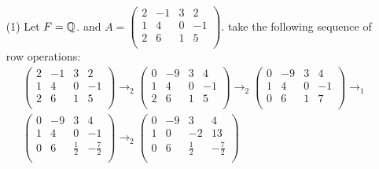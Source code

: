\begin{example}
    \begin{enumerate}
        \item[(1)] Let $F = \mathbb{Q}$. and $A=\begin{pmatrix}
                            2 & -1 & 3 & 2 \\
                            1 & 4 & 0 & -1 \\
                            2 & 6 & 1 & 5 \\
                         \end{pmatrix}$.
    take the following sequence of row operations:
        \begin{align*}
            \begin{pmatrix}
                2 & -1 & 3 & 2 \\
                1 & 4 & 0 & -1 \\
                2 & 6 & 1 & 5 \\
            \end{pmatrix}
            \rightarrow_2
            \begin{pmatrix}
                0 & -9 & 3 & 4 \\
                1 & 4 & 0 & -1 \\
                2 & 6 & 1 & 5 \\
            \end{pmatrix}
            \rightarrow_2
            \begin{pmatrix}
                0 & -9 & 3 & 4 \\
                1 & 4 & 0 & -1 \\
                0 & 6 & 1 & 7 \\
            \end{pmatrix}
            \rightarrow_1 \\
            \begin{pmatrix}
                0 & -9 & 3 & 4 \\
                1 & 4 & 0 & -1 \\
                0 & 6 & \frac{1}{2} & -\frac{7}{2} \\
            \end{pmatrix}
            \rightarrow_2
            \begin{pmatrix}
                0 & -9 & 3 & 4 \\
                1 & 0 & -2 & 13 \\
                0 & 6 & \frac{1}{2} & -\frac{7}{2} \\

\end{pmatrix}
\end{align*}
\end{enumerate}
\end{example}
